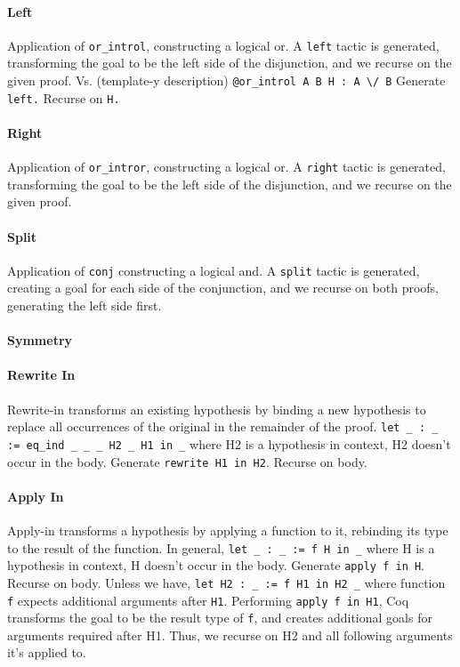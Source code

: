 \paragraph{Left}
Application of \lstinline{or_introl}, constructing a logical or. A \lstinline{left} tactic is generated, transforming the goal to be the left side of the disjunction, and we recurse on the given proof.
Vs. (template-y description)
\lstinline{@or_introl A B H : A \/ B}
Generate \lstinline{left.}
Recurse on \lstinline{H.}

\paragraph{Right}
Application of \lstinline{or_intror}, constructing a logical or. A \lstinline{right} tactic is generated, transforming the goal to be the left side of the disjunction, and we recurse on the given proof.

\paragraph{Split}
Application of \lstinline{conj} constructing a logical and. A \lstinline{split} tactic is generated, creating a goal for each side of the conjunction, and we recurse on both proofs, generating the left side first.

\paragraph{Symmetry}

\paragraph{Rewrite In}
Rewrite-in transforms an existing hypothesis by binding a new hypothesis to replace all occurrences of the original in the remainder of the proof.
\lstinline{let _ : _ := eq_ind _ _ _ H2 _ H1 in _} where
		H2 is a hypothesis in context,
		H2 doesn’t occur in the body.
		Generate \lstinline{rewrite H1 in H2}. Recurse on body.

\paragraph{Apply In}
Apply-in transforms a hypothesis by applying a function to it, rebinding its type to the result of the function.
		In general,
		\lstinline{let _ : _ := f H in _} where
		H is a hypothesis in context,
		H doesn’t occur in the body.
		Generate  \lstinline{apply f in H}. Recurse on body.
		Unless we have,
		\lstinline{let H2 : _ := f H1 in H2 _} where
function \lstinline{f} expects additional arguments after \lstinline{H1}.
Performing \lstinline{apply f in H1}, Coq transforms the goal to be the result type of \lstinline{f}, and creates additional goals for arguments required after H1. Thus, we recurse on H2 and all following arguments it’s applied to.

